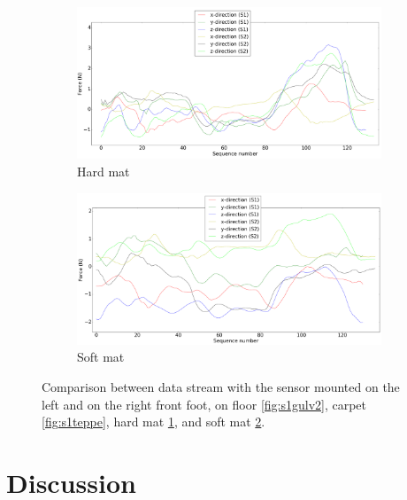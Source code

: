 \documentclass[USenglish]{ifimaster}  %
\begin{document}
	\begin{figure}[h] \ContinuedFloat
	
		\begin{subfigure}[h]{\textwidth}\ContinuedFloat
			\includegraphics[width=\textwidth,height=\textheight,keepaspectratio]{Figures/s1hardmatte}
			\caption{Hard mat}
			\label{fig:s1hardmatte}
		\end{subfigure}
		
		\begin{subfigure}[b]{\textwidth}
			\includegraphics[width=\textwidth,height=\textheight,keepaspectratio]{Figures/s1mykmatte}
			\caption{Soft mat}
			\label{fig:s1mykmatte}
		\end{subfigure}
		\caption[Comparision between data stream sensor mounted on left and right front foot of the robot]{Comparison between data stream with the sensor mounted on the left and on the right front foot, on floor \ref{fig:s1gulv2}, carpet \ref{fig:s1teppe}, hard mat \ref{fig:s1hardmatte}, and soft mat	\ref{fig:s1mykmatte}.}
		\label{fig:s1all}
	\end{figure}	
	\FloatBarrier



\chapter{Discussion}
\end{document}
